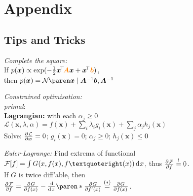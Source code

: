 \section{Appendix}

\subsection{Tips and Tricks}

\emph{Complete the square:}
\\
If $p(\bm x) \propto \exp(-\frac12 \bm x\!^\top \!\bm{{\color{orange} A}x} + \bm x\!^\top {\color{orange} \bm b})$,\\
then $p(\bm x) = \Gauss{\bm x \mid \bm A^{-1} \bm b, \bm A^{-1}}$

\emph{Constrained optimisation:}
\\
\textit{primal}: \enspace {}
\\
\textbf{Lagrangian:} \enspace with each $\alpha_j \geq 0$\\
\enspace $\mathcal L(\bm x,\lambda,\alpha) = f(\bm x) + \sum_i \lambda_i g_i(\bm x) + \sum_j \alpha_j h_j(\bm x)$
\\
Solve: \: $\pderiv{\mathcal L}{\bm x} = 0$; \: $g_i(\bm x) = 0$; \: $\alpha_j \geq 0$; \: $h_j(\bm x) \leq 0$
\iffalse
    \emph{Lagrange Multipliers:}
    \\
    Problem $\mathcal P : \begin{cases}
        \min f(\bm x),      & \bm x\in\mathbb R^d \\
        \text{s.t. } g_i(\bm x)=0,      & i\leq m \\
        \phantom{\text{s.t. }} h_j(\bm x) \leq 0,       & j\leq n
    \end{cases}$
    \\
    Lagrangian: $\mathcal L(\bm x,\lambda,\alpha) = f(\bm x) + \sum_{i\leq m} \lambda_i g_i(\bm x) + \sum_{j\leq n} \alpha_j h_j(\bm x)$ with each $\alpha_j \geq 0$.
    \\
    Solution must satisfy
    $\pderiv{\mathcal L}{\bm x} = 0$ and $\pderiv{\mathcal L}{\lambda} = 0$,
    $\alpha_j h_j(\bm x) = 0$, and
    $\alpha_j \geq 0, \forall j\leq n$.
\fi

\emph{Euler-Lagrange:}
Find extrema of functional $\mathcal F[f] = \int G(x, f(x), f’(x)) \diff x$,
thus $\pderiv{\mathcal F}{f} \overset!= 0$.
\\
If $G$ is twice diff'able, then
\\
$\pderiv{\mathcal F}{f} = \pderiv{G}{f(x)} - \deriv{}{x} \paren*{ \pderiv{G}{f'(x)} } \overset{(\ast)}= \pderiv{G}{f(x)}$.
\\
\iffalse
$(\ast)$ : when $G$ does not depend on $f'$.
\fi



